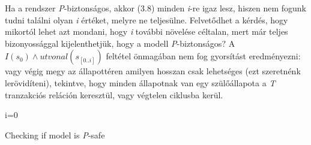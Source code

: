 Ha a rendszer \emph{P}-biztonságos, akkor (3.8) minden \emph{i}-re igaz lesz, hiszen nem fogunk tudni találni olyan \emph{i} értéket, melyre ne teljesülne. Felvetődhet a kérdés, hogy mikortól lehet azt mondani, hogy \emph{i} további növelése céltalan, mert már teljes bizonyossággal kijelenthetjük, hogy a modell \emph{P}-biztonságos? A $I(s_{0}) \wedge utvonal(s_{[0..i]})$ feltétel önmagában nem fog gyorsítást eredményezni: vagy végig megy az állapottéren amilyen hosszan csak lehetséges (ezt szeretnénk lerövidíteni), tekintve, hogy minden állapotnak van egy szülőállapota a \emph{T} tranzakciós reláción keresztül, vagy végtelen ciklusba kerül.
\newline
\newline
\begin{algorithm}[H]
	\SetAlgoLined
	\KwResult{}
	i=0\;
	\caption{Checking if model is \emph{P}-safe}
\end{algorithm}















